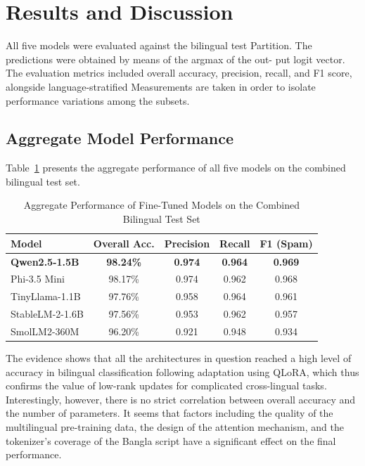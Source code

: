 \documentclass[journal]{IEEEtran}
\begin{document}
\section{Results and Discussion}

All five models were evaluated against the bilingual test
Partition. The predictions were obtained by means of the argmax of the out-
put logit vector. The evaluation metrics included overall accuracy,
precision, recall, and F1 score, alongside language-stratified
Measurements are taken in order to isolate performance variations among the subsets.

\subsection{Aggregate Model Performance}

Table~\ref{tab:aggregate_results} presents the aggregate performance of all five models on the combined bilingual test set.

\begin{table}[htbp]
\caption{Aggregate Performance of Fine-Tuned Models on the Combined Bilingual Test Set}
\label{tab:aggregate_results}
\centering
\begin{tabular}{lcccc}
\toprule
\textbf{Model} & \textbf{Overall Acc.} & \textbf{Precision} & \textbf{Recall} & \textbf{F1 (Spam)} \\
\midrule
\rowcolor{gray!20} \textbf{Qwen2.5-1.5B} & \textbf{98.24\%} & \textbf{0.974} & \textbf{0.964} & \textbf{0.969} \\
Phi-3.5 Mini & 98.17\% & 0.974 & 0.962 & 0.968 \\
TinyLlama-1.1B & 97.76\% & 0.958 & 0.964 & 0.961 \\
StableLM-2-1.6B & 97.56\% & 0.953 & 0.962 & 0.957 \\
SmolLM2-360M & 96.20\% & 0.921 & 0.948 & 0.934 \\
\bottomrule
\end{tabular}
\end{table}



The evidence shows that all the architectures in question reached a high level of accuracy in bilingual classification following adaptation using QLoRA, which thus confirms the value of low-rank updates for complicated cross-lingual tasks. Interestingly, however, there is no strict correlation between overall accuracy and the number of parameters. It seems that factors including the quality of the multilingual pre-training data, the design of the attention mechanism, and the tokenizer's coverage of the Bangla script have a significant effect on the final performance.
\end{document}
